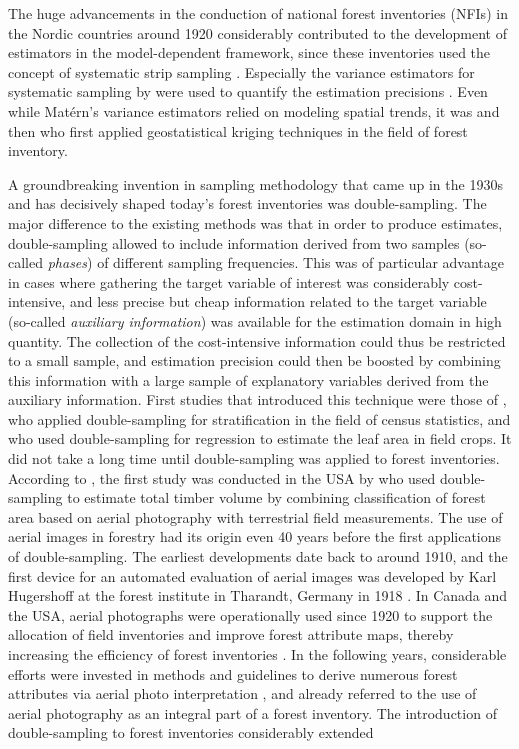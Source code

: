 The huge advancements in the conduction of national forest inventories (NFIs) in the Nordic countries around 1920 considerably contributed to the development of estimators in the model-dependent framework, since these inventories used the concept of systematic strip sampling \citep{kangas2006}. Especially the variance estimators for systematic sampling by \citet{matern1960, matern1947} were used to quantify the estimation precisions \citep{kangas2006}. Even while Mat\'{e}rn's variance estimators relied on modeling spatial trends, it was \citet{houllier1987} and then \citet{mandallaz1993} who first applied geostatistical kriging techniques in the field of forest inventory.\par

A groundbreaking invention in sampling methodology that came up in the 1930s and has decisively shaped today's forest inventories was double-sampling. The major difference to the existing methods was that in order to produce estimates, double-sampling allowed to include information derived from two samples (so-called \textit{phases}) of different sampling frequencies. This was of particular advantage in cases where gathering the target variable of interest was considerably cost-intensive, and less precise but cheap information related to the target variable (so-called \textit{auxiliary information}) was available for the estimation domain in high quantity. The collection of the cost-intensive information could thus be restricted to a small sample, and estimation precision could then be boosted by combining this information with a large sample of explanatory variables derived from the auxiliary information. First studies that introduced this technique were those of \citet{neyman1938}, who applied double-sampling for stratification in the field of census statistics, and \citet{watson1937} who used double-sampling for regression to estimate the leaf area in field crops. It did not take a long time until double-sampling was applied to forest inventories. According to \citet{kangas2006}, the first study was conducted in the USA by \citet{bickford1952, bickford1953} who used double-sampling to estimate total timber volume by combining classification of forest area based on aerial photography with terrestrial field measurements. The use of aerial images in forestry had its origin even 40 years before the first applications of double-sampling. The earliest developments date back to around 1910, and the first device for an automated evaluation of aerial images was developed by Karl Hugershoff at the forest institute in Tharandt, Germany in 1918 \citep{prager1961}. In Canada and the USA, aerial photographs were operationally used since 1920 to support the allocation of field inventories and improve forest attribute maps, thereby increasing the efficiency of forest inventories \citep{langballe1938}. In the following years, considerable efforts were invested in methods and guidelines to derive numerous forest attributes via aerial photo interpretation \citep[e.g.,][]{hildebrandt1996}, and \citet{zoehrer1980} already referred to the use of aerial photography as an integral part of a forest inventory. The introduction of double-sampling to forest inventories considerably extended 